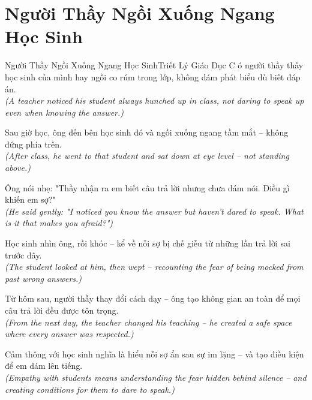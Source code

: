 \section{Người Thầy Ngồi Xuống Ngang Học Sinh}
\begin{truyen}{Người Thầy Ngồi Xuống Ngang Học Sinh}{Triết Lý Giáo Dục}
C ó người thầy thấy học sinh của mình hay ngồi co rúm trong lớp, không dám phát biểu dù biết đáp án.\\
\textit{(A teacher noticed his student always hunched up in class, not daring to speak up even when knowing the answer.)}

Sau giờ học, ông đến bên học sinh đó và ngồi xuống ngang tầm mắt -- không đứng phía trên.\\
\textit{(After class, he went to that student and sat down at eye level -- not standing above.)}

Ông nói nhẹ: "Thầy nhận ra em biết câu trả lời nhưng chưa dám nói. Điều gì khiến em sợ?"\\
\textit{(He said gently: "I noticed you know the answer but haven't dared to speak. What is it that makes you afraid?")}

Học sinh nhìn ông, rồi khóc -- kể về nỗi sợ bị chế giễu từ những lần trả lời sai trước đây.\\
\textit{(The student looked at him, then wept -- recounting the fear of being mocked from past wrong answers.)}

Từ hôm sau, người thầy thay đổi cách dạy -- ông tạo không gian an toàn để mọi câu trả lời đều được tôn trọng.\\
\textit{(From the next day, the teacher changed his teaching -- he created a safe space where every answer was respected.)}

\end{truyen}
\begin{baihoc}
  Cảm thông với học sinh nghĩa là hiểu nỗi sợ ẩn sau sự im lặng -- và tạo điều kiện để em dám lên tiếng.\\
  \textit{(Empathy with students means understanding the fear hidden behind silence -- and creating conditions for them to dare to speak.)}
\end{baihoc}

